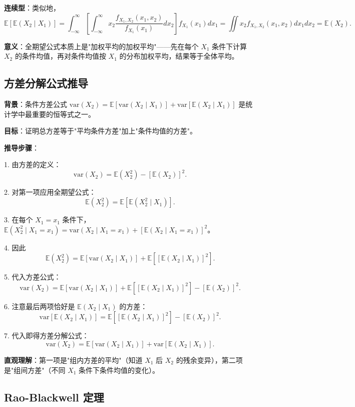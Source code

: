 \textbf{连续型}：类似地，
\[
\mathbb{E}[\mathbb{E}(X_2 \mid X_1)] = \int_{-\infty}^{\infty} \left[ \int_{-\infty}^{\infty} x_2 \frac{f_{X_1, X_2}(x_1, x_2)}{f_{X_1}(x_1)} dx_2 \right] f_{X_1}(x_1) dx_1 = \iint x_2 f_{X_1, X_2}(x_1, x_2) dx_1 dx_2 = \mathbb{E}(X_2).
\]

\textbf{意义}：全期望公式本质上是"加权平均的加权平均"——先在每个 $X_1$ 条件下计算 $X_2$ 的条件均值，再对条件均值按 $X_1$ 的分布加权平均，结果等于全体平均。

\subsection{方差分解公式推导}\label{sec:derivation-ch2-variance-inequality}

\textbf{背景}：条件方差公式 $\text{var}(X_2) = \mathbb{E}[\text{var}(X_2 \mid X_1)] + \text{var}[\mathbb{E}(X_2 \mid X_1)]$ 是统计学中最重要的恒等式之一。

\textbf{目标}：证明总方差等于"平均条件方差"加上"条件均值的方差"。

\textbf{推导步骤}：

1. 由方差的定义：
\[
\text{var}(X_2) = \mathbb{E}(X_2^2) - [\mathbb{E}(X_2)]^2.
\]

2. 对第一项应用全期望公式：
\[
\mathbb{E}(X_2^2) = \mathbb{E}[\mathbb{E}(X_2^2 \mid X_1)].
\]

3. 在每个 $X_1 = x_1$ 条件下，$\mathbb{E}(X_2^2 \mid X_1 = x_1) = \text{var}(X_2 \mid X_1 = x_1) + [\mathbb{E}(X_2 \mid X_1 = x_1)]^2$。

4. 因此
\[
\mathbb{E}(X_2^2) = \mathbb{E}[\text{var}(X_2 \mid X_1)] + \mathbb{E}[[\mathbb{E}(X_2 \mid X_1)]^2].
\]

5. 代入方差公式：
\[
\text{var}(X_2) = \mathbb{E}[\text{var}(X_2 \mid X_1)] + \mathbb{E}[[\mathbb{E}(X_2 \mid X_1)]^2] - [\mathbb{E}(X_2)]^2.
\]

6. 注意最后两项恰好是 $\mathbb{E}(X_2 \mid X_1)$ 的方差：
\[
\text{var}[\mathbb{E}(X_2 \mid X_1)] = \mathbb{E}[[\mathbb{E}(X_2 \mid X_1)]^2] - [\mathbb{E}(X_2)]^2.
\]

7. 代入即得方差分解公式：
\[
\text{var}(X_2) = \mathbb{E}[\text{var}(X_2 \mid X_1)] + \text{var}[\mathbb{E}(X_2 \mid X_1)].
\]

\textbf{直观理解}：第一项是"组内方差的平均"（知道 $X_1$ 后 $X_2$ 的残余变异），第二项是"组间方差"（不同 $X_1$ 条件下条件均值的变化）。

\subsection{Rao-Blackwell 定理}\label{sec:derivation-ch2-rao-blackwell}

